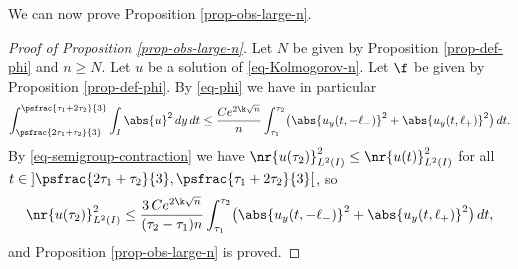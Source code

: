 We can now prove Proposition \ref{prop-obs-large-n}.

\begin{proof}[Proof of Proposition \ref{prop-obs-large-n}]
Let $N$ be given by Proposition \ref{prop-def-phi} and $n \geq N$. Let $u$ be a solution of \eqref{eq-Kolmogorov-n}. Let $\f$ be given by Proposition \ref{prop-def-phi}. By \eqref{eq-phi} we have in particular
\[
\int_{\psfrac{2 \tau_1 + \tau_2}{3}}^{\psfrac{\tau_1 + 2\tau_2}{3}} \int_{I} \abs{u}^2 \, dy \, dt \leq \frac {C e^{2 \k \sqrt n}} n \int_{\tau_1}^{\tau_2} \bigl(\abs{u_y (t,-\ell_-)}^2 + \abs{u_y(t,\ell_+)}^2 \bigr) \, dt.
\]
By \eqref{eq-semigroup-contraction} we have $\nr{u(\tau_2)}_{L^2(I)}^2 \leq \nr{u(t)}_{L^2(I)}^2$ for all $t \in{}] \psfrac{2\tau_1 + \tau_2}{3}, \psfrac{\tau_1 + 2\tau_2}{3}[$, so
\[
\nr{u(\tau_2)}_{L^2(I)}^2 \leq \frac{3\,C e^{2 \k \sqrt n}}{(\tau_2-\tau_1)n} \int_{\tau_1}^{\tau_2} \bigl(\abs{u_y (t,-\ell_-)}^2 + \abs{u_y(t,\ell_+)}^2 \bigr) \, dt,
\]
and Proposition \ref{prop-obs-large-n} is proved.
\end{proof}
